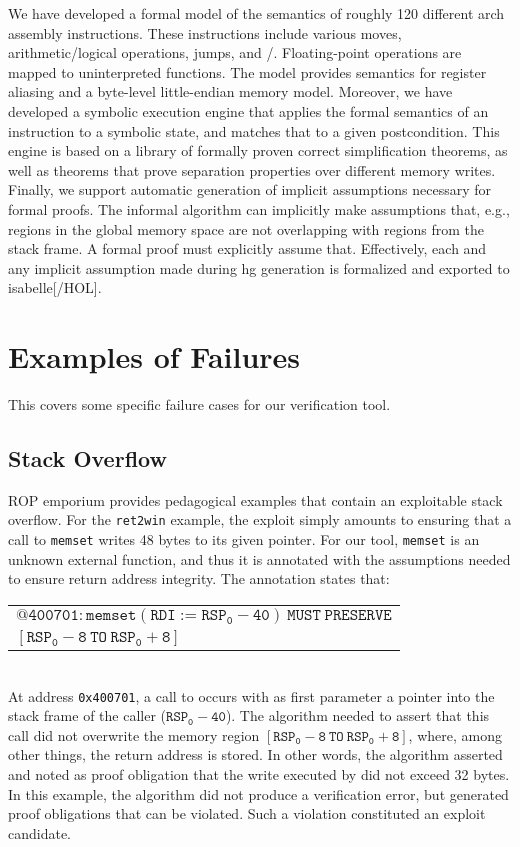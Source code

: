 We have developed a formal model of the semantics of roughly \num{120} different \gls{arch} assembly instructions.
These instructions include various moves, arithmetic/logical operations, jumps, and /.
Floating-point operations are mapped to uninterpreted functions.
The model provides semantics for register aliasing and a byte-level little-endian memory model.
Moreover, we have developed a symbolic execution engine that applies the formal semantics of an instruction to a symbolic state, and matches that to a given postcondition.
This engine is based on a library of formally proven correct simplification theorems, as well as theorems that prove separation properties over different memory writes.
Finally, we support automatic generation of implicit assumptions necessary for formal proofs.
The informal algorithm can implicitly make assumptions that, e.g., regions in the global memory space are not overlapping with regions from the stack frame.
A formal proof must explicitly assume that.
Effectively, each and any implicit assumption made during \ac{hg} generation is formalized and exported to \gls{isabelle}[/HOL].

\section{Examples of Failures}\label{sec:not-me-failures}
This  covers some specific failure cases for our verification tool.

\subsection{Stack Overflow}
ROP emporium provides pedagogical examples that contain an exploitable stack overflow.
For the \texttt{ret2win} example, the exploit simply amounts to ensuring that a call to \texttt{memset} writes 48 bytes to its given pointer.
For our tool, \texttt{memset} is an unknown external function, and thus it is annotated with the assumptions needed to ensure return address integrity.
The annotation states that:
\\[1ex]
\begin{tabular}{l}
  $\mathtt{@400701: memset(RDI:=RSP_0 - 40)~MUST~PRESERVE }$\\
  \hspace{32ex}$\mathtt{ [ RSP_0 - 8~TO~RSP_0 + 8 ]}$
\end{tabular}
\\[1ex]
At address \texttt{0x400701}, a call to  occurs with as first parameter a pointer into the stack frame of the caller ($\mathtt{RSP_0 - 40}$).
The algorithm needed to assert that this call did not overwrite the memory region $\mathtt{[ RSP_0 - 8 ~TO~ RSP_0 + 8 ]}$, where, among other things, the return address is stored.
In other words, the algorithm asserted and noted as proof obligation that the write executed by  did not exceed 32 bytes.
In this example, the algorithm did not produce a verification error, but generated proof obligations that can be violated. Such a violation constituted an exploit candidate.

